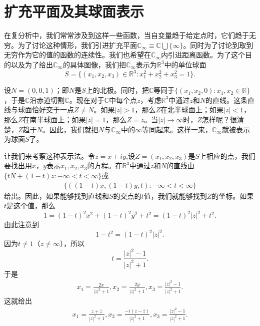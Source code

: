 \section{扩充平面及其球面表示}\label{subsection0020106}
在复分析中，我们常常涉及到这样一些函数，当自变量趋于给定点时，它们趋于无穷。为了讨论这种情形，我们引进扩充平面$\mathbb{C}_{\infty}\equiv \mathbb{C} \bigcup \{\infty\}$。同时为了讨论到取到无穷作为它的值的函数的连续性。我们也希望在$\mathbb{C}_{\infty}$内引进距离函数。为了这个目的以及为了给出$\mathbb{C}_{\infty}$的具体图像，我们把$\mathbb{C}_{\infty}$表示为$\mathbb{R}^3$中的单位球面
\[
S = \{(x_1,x_2,x_3) \in \mathbb{R}^3:x_1^2 + x_2^2 + x_3^2=1\}.
\]

设$N=(0, 0,1)$；即$N$是$S$上的北极。同时，把$\mathbb{C}$等同于$\{(x_1,x_2,0):x_1,x_2 \in \mathbb{R}\}$，于是$\mathbb{C}$沿赤道切割$\mathbb{C}$。现在对于$\mathbb{C}$中每个点$z$，考虑$\mathbb{R}^3$中通过$z$和$N$的直线。这条直线与球面恰好交于一点$Z \neq N$。如果$|z| > 1$，那么$Z$在北半球面上；如果$|z|<1$，那么$Z$在南半球面上；如果$|z|=1$，那么$Z = z$。当$|z| \to \infty$时，$Z$怎样呢？很清楚，$Z$趋于$N$。因此，我们就把$N$与$\mathbb{C}_{\infty}$中的$\infty$等同起来。这样一来，$\mathbb{C}_{\infty}$就被表示为球面$S$了。

让我们来考察这种表示法。令$z=x+iy$,设$Z = (x_1, x_2, x_3)$是$S$上相应的点，我们要找出用$x$，$y$表示$x_1, x_2, x_3$的方程。在$\mathbb{R}^3$中通过$z$和$N$的直线由$\{tN + (1-t)z:-\infty<t<\infty\}$或
\begin{gather}\label{equ002010601}
\{((1-t)x, (1-t)y, t): -\infty < t < \infty\}
\end{gather}
给出。因此，如果能够找到直线和$S$的交点的$t$值，我们就能够找到$Z$的坐标。如果$t$是这个值，那么
\[
1 = (1-t)^2x^2 + (1-t)^2y^2 + t^2 = (1-t)^2|z|^2 + t^2.
\]
由此注意到
\[
1-t^2 = (1-t)^2|z|^2.
\]
因为$t \neq 1$（$z \neq \infty$），所以
\[
t = \frac{|z|^2-1}{|z|^2+1}.
\]
于是
\begin{gather}\label{equ002010602}
x_1 = \frac{2x}{|z|^2+1}, x_2 = \frac{2y}{|z|^2+1}, x_3 = \frac{|z|^2-1}{|z|^2+1}.
\end{gather}
这就给出
\begin{gather}\label{equ002010603}
x_1 = \frac{z + \bar{z}}{|z|^2+1}, x_2 = \frac{-i(z-\bar{z})}{|z|^2+1}, x_3 = \frac{|z|^2-1}{|z|^2+1}.
\end{gather}

